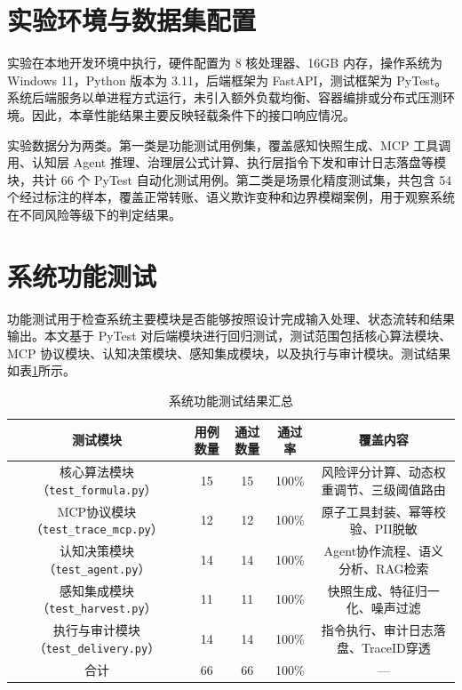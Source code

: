 \documentclass{xduugthesis}
\begin{document}
\section{实验环境与数据集配置}

实验在本地开发环境中执行，硬件配置为 8 核处理器、16GB 内存，操作系统为 Windows 11，Python 版本为 3.11，后端框架为 FastAPI，测试框架为 PyTest。系统后端服务以单进程方式运行，未引入额外负载均衡、容器编排或分布式压测环境。因此，本章性能结果主要反映轻载条件下的接口响应情况。

实验数据分为两类。第一类是功能测试用例集，覆盖感知快照生成、MCP 工具调用、认知层 Agent 推理、治理层公式计算、执行层指令下发和审计日志落盘等模块，共计 66 个 PyTest 自动化测试用例。第二类是场景化精度测试集，共包含 54 个经过标注的样本，覆盖正常转账、语义欺诈变种和边界模糊案例，用于观察系统在不同风险等级下的判定结果。

\section{系统功能测试}

功能测试用于检查系统主要模块是否能够按照设计完成输入处理、状态流转和结果输出。本文基于 PyTest 对后端模块进行回归测试，测试范围包括核心算法模块、MCP 协议模块、认知决策模块、感知集成模块，以及执行与审计模块。测试结果如表\ref{tab:func-test-results}所示。

\begin{table}[H]
    \centering
    \caption{系统功能测试结果汇总}
    \label{tab:func-test-results}
    \begin{tabular}{|c|c|c|c|c|}
        \hline
        测试模块 & 用例数量 & 通过数量 & 通过率 & 覆盖内容 \\
        \hline
        核心算法模块（\texttt{test\_formula.py}） & 15 & 15 & 100\% & 风险评分计算、动态权重调节、三级阈值路由 \\
        \hline
        MCP协议模块（\texttt{test\_trace\_mcp.py}） & 12 & 12 & 100\% & 原子工具封装、幂等校验、PII脱敏 \\
        \hline
        认知决策模块（\texttt{test\_agent.py}） & 14 & 14 & 100\% & Agent协作流程、语义分析、RAG检索 \\
        \hline
        感知集成模块（\texttt{test\_harvest.py}） & 11 & 11 & 100\% & 快照生成、特征归一化、噪声过滤 \\
        \hline
        执行与审计模块（\texttt{test\_delivery.py}） & 14 & 14 & 100\% & 指令执行、审计日志落盘、TraceID穿透 \\
        \hline
        合计 & 66 & 66 & 100\% & — \\
        \hline
    \end{tabular}
\end{table}
\end{document}
